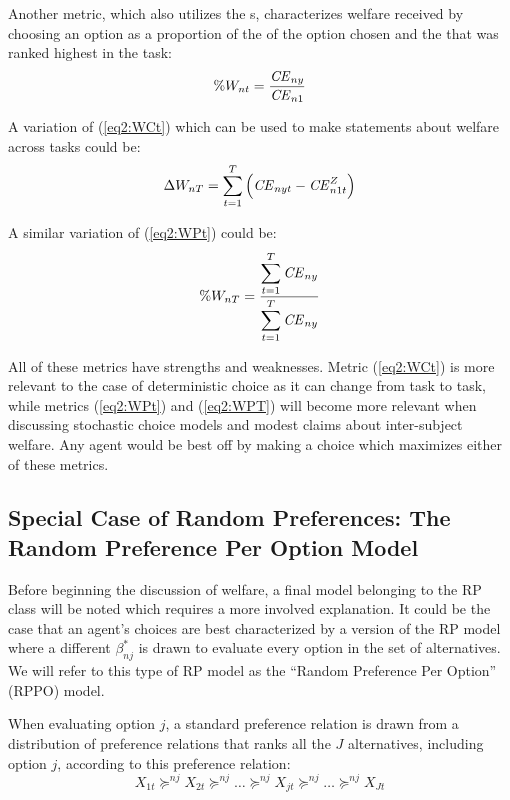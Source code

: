 \documentclass[../main.tex]{subfiles}
\begin{document}
Another metric, which also utilizes the {\CE}s, characterizes welfare received by choosing an option as a proportion of the {\CE} of the option chosen and the {\CE} that was ranked highest in the task:
\begin{equation}
	\label{eq2:WPt}
	\%W_{nt} = \frac{ {\mathit{CE}}_{ny} }{ {\mathit{CE}}_{n1} }
\end{equation}

\noindent A variation of (\ref{eq2:WCt}) which can be used to make statements about welfare across tasks could be:
\begin{equation}
	\label{eq2:WCT}
	\Delta W_{nT} = \sum_{t=1}^T \left( {\mathit{CE}}_{nyt} - {\mathit{CE}}_{n1t}^Z \right)
\end{equation}

\noindent A similar variation of (\ref{eq2:WPt}) could be:
\begin{equation}
	\label{eq2:WPT}
	\%W_{nT} = \frac{\displaystyle\sum_{t=1}^{T} {\mathit{CE}}_{ny} }{\displaystyle\sum_{t=1}^{T} {\mathit{CE}}_{ny}}
\end{equation}

All of these metrics have strengths and weaknesses.
Metric (\ref{eq2:WCt}) is more relevant to the case of deterministic choice as it can change from task to task, while metrics (\ref{eq2:WPt}) and (\ref{eq2:WPT}) will become more relevant when discussing stochastic choice models and modest claims about inter-subject welfare.
Any agent would be best off by making a choice which maximizes either of these metrics.

\subsection{Special Case of Random Preferences: The Random Preference Per Option Model}

Before beginning the discussion of welfare, a final model belonging to the RP class will be noted which requires a more involved explanation.
It could be the case that an agent's choices are best characterized by a version of the RP model where a different $\beta^*_{nj}$ is drawn to evaluate every option in the set of alternatives.
We will refer to this type of RP model as the \enquote{Random Preference Per Option} (RPPO) model.

When evaluating option $j$, a standard preference relation is drawn from a distribution of preference relations that ranks all the $J$ alternatives, including option $j$, according to this preference relation:
\begin{equation}
	\label{eq2:RPPO.jorank}
	X_{1t} \succcurlyeq^{nj} X_{2t} \succcurlyeq^{nj} \ldots \succcurlyeq^{nj} X_{jt} \succcurlyeq^{nj} \ldots \succcurlyeq^{nj} X_{Jt}
\end{equation}
\end{document}

